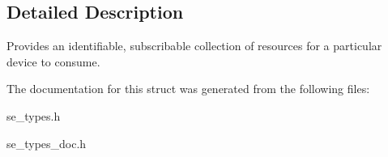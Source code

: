 \subsection{Detailed Description}
Provides an identifiable, subscribable collection of resources for a particular device to consume. 

The documentation for this struct was generated from the following files\+:\begin{DoxyCompactItemize}
\item 
se\+\_\+types.\+h\item 
se\+\_\+types\+\_\+doc.\+h\end{DoxyCompactItemize}
